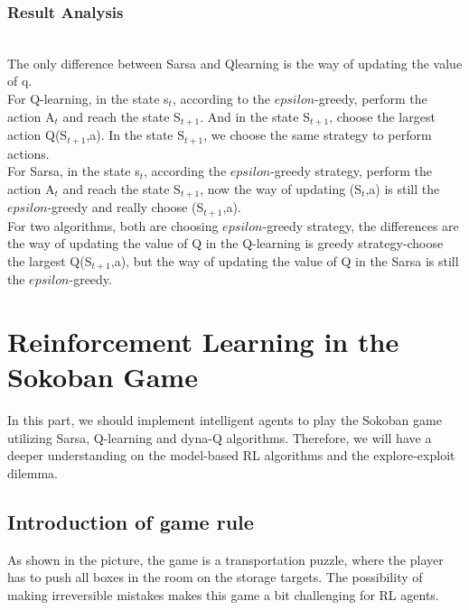 \documentclass[aps,letterpaper,10pt]{revtex4}
\begin{document}
\subsubsection{Result Analysis}
\\The only difference between Sarsa and Qlearning is the way of updating the value of q.
\\For Q-learning, in the state s$_t$, according to the $epsilon$-greedy, perform the action A$_t$ and reach the state S$_{t+1}$. And in the state S$_{t+1}$, choose the largest action Q(S$_{t+1}$,a). In the state S$_{t+1}$, we choose the same strategy to perform actions.
\\For Sarsa, in the state s$_t$, according the $epsilon$-greedy strategy, perform the action A$_t$ and reach the state S$_{t+1}$, now the way of updating (S$_t$,a) is still the $epsilon$-greedy and really choose (S$_{t+1}$,a).
\\For two algorithms, both are choosing $epsilon$-greedy strategy, the differences are the way of updating the value of Q in the Q-learning is greedy strategy-choose the largest Q(S$_{t+1}$,a), but the way of updating the value of Q in the Sarsa is still the $epsilon$-greedy.



\section{Reinforcement Learning in the Sokoban Game}
In this part, we should implement intelligent agents to play the Sokoban game utilizing Sarsa, Q-learning and dyna-Q algorithms. Therefore, we will have a deeper understanding on the model-based RL algorithms and the explore-exploit dilemma.
\subsection{Introduction of game rule}
As shown in the picture, the game is a transportation puzzle, where the player has to push all boxes in the room on the storage targets. The possibility of making irreversible mistakes makes this game a bit challenging for RL agents.
\begin{figure}[H]
	  \centering
	   
	  \label{fig:oscil}
	\end{figure}
\end{document}
